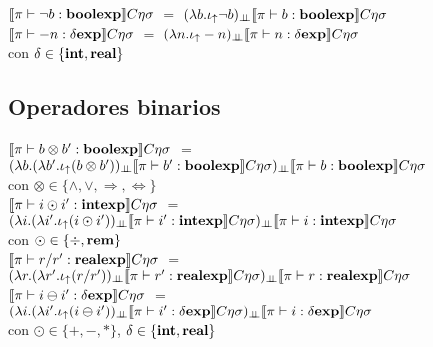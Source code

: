$\llbracket  \pi \vdash \neg b : \textbf{boolexp}  \rrbracket C\eta\sigma$ 
$=$ 
$(\lambda b . \iota_{\uparrow} \neg b)_{\bot \!\!\! \bot}\llbracket \pi \vdash b : \textbf{boolexp} \rrbracket C\eta\sigma$\\

\noindent
$\llbracket  \pi \vdash -n : \delta \textbf{exp}  \rrbracket C\eta\sigma$ 
$=$ 
$(\lambda n . \iota_{\uparrow} -n)_{\bot \!\!\! \bot}\llbracket \pi \vdash n : \delta \textbf{exp} \rrbracket C\eta\sigma$\\

\noindent
con $\delta \in \{ \textbf{int},\textbf{real} \}$

\subsection{Operadores binarios}

$\llbracket  \pi \vdash b \otimes b' : \textbf{boolexp}  \rrbracket C\eta\sigma$ 
$=$ \\
\indent
$(\lambda b . (\lambda b' . \iota_{\uparrow} (b \otimes b'))_{\bot \!\!\! \bot}
\llbracket \pi \vdash b' : \textbf{boolexp} \rrbracket C\eta\sigma)_{\bot \!\!\! \bot}
\llbracket \pi \vdash b : \textbf{boolexp} \rrbracket C\eta\sigma$\\

con $\otimes \in \{ \wedge,\vee,\Rightarrow,\Leftrightarrow \}$\\

\noindent
$\llbracket  \pi \vdash i \odot i' : \textbf{intexp}  \rrbracket C\eta\sigma$ 
$=$ \\
\indent
$(\lambda i . (\lambda i' . \iota_{\uparrow} (i \odot i'))_{\bot \!\!\! \bot}
\llbracket \pi \vdash i' : \textbf{intexp} \rrbracket C\eta\sigma)_{\bot \!\!\! \bot}
\llbracket \pi \vdash i : \textbf{intexp} \rrbracket C\eta\sigma$\\

con $\odot \in \{ \div,\textbf{rem} \}$\\

\noindent
$\llbracket  \pi \vdash r / r' : \textbf{realexp}  \rrbracket C\eta\sigma$ 
$=$ \\
\indent
$(\lambda r . (\lambda r' . \iota_{\uparrow} (r / r'))_{\bot \!\!\! \bot}
\llbracket \pi \vdash r' : \textbf{realexp} \rrbracket C\eta\sigma)_{\bot \!\!\! \bot}
\llbracket \pi \vdash r : \textbf{realexp} \rrbracket C\eta\sigma$\\

\noindent
$\llbracket  \pi \vdash i \ominus i' : \delta \textbf{exp}  \rrbracket C\eta\sigma$ 
$=$ \\
\indent
$(\lambda i . (\lambda i' . \iota_{\uparrow} (i \ominus i'))_{\bot \!\!\! \bot}
\llbracket \pi \vdash i' : \delta \textbf{exp} \rrbracket C\eta\sigma)_{\bot \!\!\! \bot}
\llbracket \pi \vdash i : \delta \textbf{exp} \rrbracket C\eta\sigma$\\

con $\odot \in \{ +,-,* \}$, $\delta \in \{\textbf{int},\textbf{real}\}$\\

